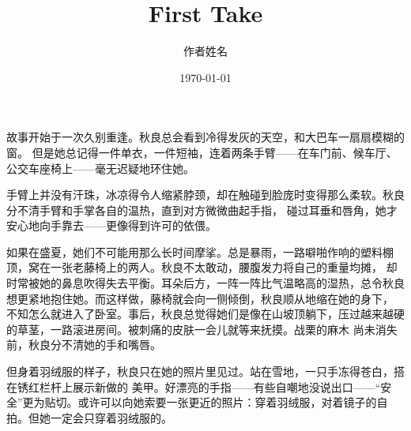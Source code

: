 \documentclass[12pt,openany]{book}  %
\title{First Take}
\author{作者姓名}
\date{\today}
\begin{document}
\maketitle
\newpage


\chapter{}
故事开始于一次久别重逢。秋良总会看到冷得发灰的天空，和大巴车一扇扇模糊的窗。
但是她总记得一件单衣，一件短袖，连着两条手臂——在车门前、候车厅、公交车座椅上——毫无迟疑地环住她。

手臂上并没有汗珠，冰凉得令人缩紧脖颈，却在触碰到脸庞时变得那么柔软。秋良分不清手臂和手掌各自的温热，直到对方微微曲起手指，
碰过耳垂和唇角，她才安心地向手靠去——更像得到许可的依偎。

如果在盛夏，她们不可能用那么长时间摩挲。总是暴雨，一路噼啪作响的塑料棚顶，窝在一张老藤椅上的两人。秋良不太敢动，腰腹发力将自己的重量均摊，
却时常被她的鼻息吹得失去平衡。耳朵后方，一阵一阵比气温略高的湿热，总令秋良想更紧地抱住她。而这样做，藤椅就会向一侧倾倒，秋良顺从地缩在她的身下，
不知怎么就进入了卧室。事后，秋良总觉得她们是像在山坡顶躺下，压过越来越硬的草茎，一路滚进房间。被刺痛的皮肤一会儿就等来抚摸。战栗的麻木
尚未消失前，秋良分不清她的手和嘴唇。

但身着羽绒服的样子，秋良只在她的照片里见过。站在雪地，一只手冻得苍白，搭在锈红栏杆上展示新做的
美甲。好漂亮的手指——有些自嘲地没说出口——“安全”更为贴切。或许可以向她索要一张更近的照片：穿着羽绒服，对着镜子的自拍。但她一定会只穿着羽绒服的。


\newpage
\end{document}
